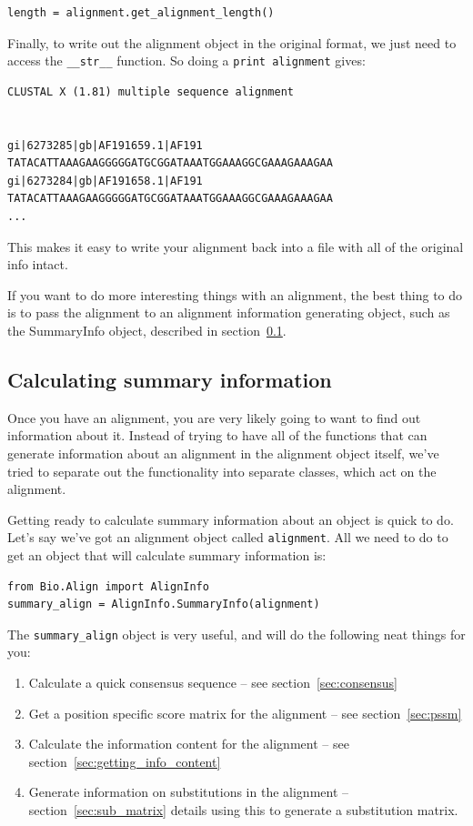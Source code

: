 \documentclass{report}
\begin{document}
\begin{verbatim}
length = alignment.get_alignment_length()
\end{verbatim}

Finally, to write out the alignment object in the original format, we just need to access the \verb|__str__| function. So doing a \verb|print alignment| gives:

\begin{verbatim}
CLUSTAL X (1.81) multiple sequence alignment


gi|6273285|gb|AF191659.1|AF191      TATACATTAAAGAAGGGGGATGCGGATAAATGGAAAGGCGAAAGAAAGAA
gi|6273284|gb|AF191658.1|AF191      TATACATTAAAGAAGGGGGATGCGGATAAATGGAAAGGCGAAAGAAAGAA
...
\end{verbatim}

This makes it easy to write your alignment back into a file with all of the original info intact.

If you want to do more interesting things with an alignment, the best thing to do is to pass the alignment to an alignment information generating object, such as the SummaryInfo object, described in section~\ref{sec:summary_info}.

\subsection{Calculating summary information}
\label{sec:summary_info}

Once you have an alignment, you are very likely going to want to find out information about it. Instead of trying to have all of the functions that can generate information about an alignment in the alignment object itself, we've tried to separate out the functionality into separate classes, which act on the alignment.

Getting ready to calculate summary information about an object is quick to do. Let's say we've got an alignment object called \verb|alignment|. All we need to do to get an object that will calculate summary information is:

\begin{verbatim}
from Bio.Align import AlignInfo
summary_align = AlignInfo.SummaryInfo(alignment)
\end{verbatim}

The \verb|summary_align| object is very useful, and will do the following neat things for you:

\begin{enumerate}
  \item Calculate a quick consensus sequence -- see section~\ref{sec:consensus}
  \item Get a position specific score matrix for the alignment -- see section~\ref{sec:pssm}
  \item Calculate the information content for the alignment -- see section~\ref{sec:getting_info_content}
  \item Generate information on substitutions in the alignment -- section~\ref{sec:sub_matrix} details using this to generate a substitution matrix.
\end{enumerate}
\end{document}
